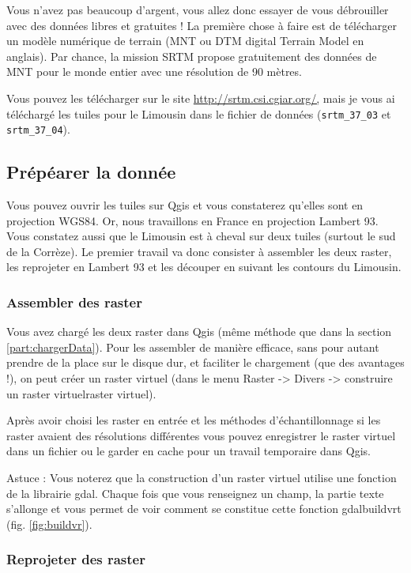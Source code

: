 \documentclass[a4paper, 11pt]{article}
\begin{document}
  Vous n'avez pas beaucoup d'argent, vous allez donc essayer de vous débrouiller avec des données libres et gratuites ! La première chose à faire est de télécharger un modèle numérique de terrain (MNT ou DTM digital Terrain Model en anglais). Par chance, la mission SRTM propose gratuitement des données de MNT pour le monde entier avec une résolution de 90 mètres.

  Vous pouvez les télécharger sur le site \url{http://srtm.csi.cgiar.org/,} mais je vous ai téléchargé les tuiles pour le Limousin dans le fichier de données (\texttt{srtm\_37\_03} et \texttt{srtm\_37\_04}).

  \subsection{Prépéarer la donnée}

  Vous pouvez ouvrir les tuiles sur Qgis et vous constaterez qu'elles sont en projection WGS84. Or, nous travaillons en France en projection Lambert 93. Vous constatez aussi que le Limousin est à cheval sur deux tuiles (surtout le sud de la Corrèze). Le premier travail va donc consister à assembler les deux raster, les reprojeter en Lambert 93 et les découper en suivant les contours du Limousin.

    \subsubsection{Assembler des raster}

    Vous avez chargé les deux raster dans Qgis (même méthode que dans la section \ref{part:chargerData}). Pour les assembler de manière efficace, sans pour autant prendre de la place sur le disque dur, et faciliter le chargement (que des avantages !), on peut créer un raster virtuel (dans le menu Raster -> Divers -> construire un raster virtuelraster virtuel).

    Après avoir choisi les raster en entrée et les méthodes d'échantillonnage si les raster avaient des résolutions différentes vous pouvez enregistrer le raster virtuel dans un fichier ou le garder en cache pour un travail temporaire dans Qgis.

    Astuce : Vous noterez que la construction d'un raster virtuel utilise une fonction de la librairie gdal. Chaque fois que vous renseignez un champ, la partie texte s'allonge et vous permet de voir comment se constitue cette fonction gdalbuildvrt (fig. \ref{fig:buildvr}).

    \subsubsection{Reprojeter des raster}
\end{document}
